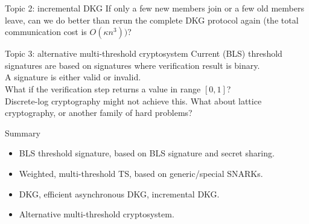 \documentclass[10pt]{beamer}
\begin{document}
\begin{frame}{Topic 2: incremental DKG}
    If only a few new members join or a few old members leave, can we do better than rerun the complete DKG protocol again (the total communication cost is $O(\kappa n^3))$? \\
\end{frame}

\begin{frame}{Topic 3: alternative multi-threshold cryptosystem}
    Current (BLS) threshold signatures are based on signatures where verification result is binary. \\
    A signature is either valid or invalid. \\
    \vspace{0.5em} 
    What if the verification step returns a value in range $[0,1]$? \\
    Discrete-log cryptography might not achieve this. What about lattice cryptography, or another family of hard problems?  
\end{frame}

\begin{frame}{Summary}
    \begin{itemize}
        \item BLS threshold signature, based on BLS signature and secret sharing.
        \item Weighted, multi-threshold TS, based on generic/special SNARKs. 
        \item DKG, efficient asynchronous DKG, incremental DKG. 
        \item Alternative multi-threshold cryptosystem. 
    \end{itemize}
\end{frame}
\end{document}
